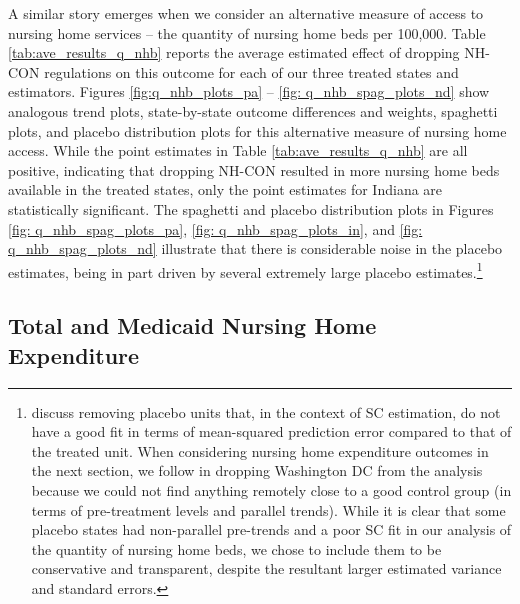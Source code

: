 \documentclass[../Main.tex]{subfiles}
\begin{document}
\indent A similar story emerges when we consider an alternative measure of access to nursing home services -- the quantity of nursing home beds per 100,000. Table \ref{tab:ave_results_q_nhb} reports the average estimated effect of dropping NH-CON regulations on this outcome for each of our three treated states and estimators. Figures \ref{fig:q_nhb_plots_pa} -- \ref{fig: q_nhb_spag_plots_nd} show analogous trend plots, state-by-state outcome differences and weights, spaghetti plots, and placebo distribution plots for this alternative measure of nursing home access. While the point estimates in Table \ref{tab:ave_results_q_nhb} are all positive, indicating that dropping NH-CON resulted in more nursing home beds available in the treated states, only the point estimates for Indiana are statistically significant. The spaghetti and placebo distribution plots in Figures \ref{fig: q_nhb_spag_plots_pa}, \ref{fig: q_nhb_spag_plots_in}, and \ref{fig: q_nhb_spag_plots_nd} illustrate that there is considerable noise in the placebo estimates, being in part driven by several extremely large placebo estimates.\footnote{\citet{abadie2010synthetic} discuss removing placebo units that, in the context of SC estimation, do not have a good fit in terms of mean-squared prediction error compared to that of the treated unit. When considering nursing home expenditure outcomes in the next section, we follow \citet{abadie2010synthetic} in dropping Washington DC from the analysis because we could not find anything remotely close to a good control group (in terms of pre-treatment levels and parallel trends). While it is clear that some placebo states had non-parallel pre-trends and a poor SC fit in our analysis of the quantity of nursing home beds, we chose to include them to be conservative and transparent, despite the resultant larger estimated variance and standard errors.}

\subsection{Total and Medicaid Nursing Home Expenditure}
\end{document}
